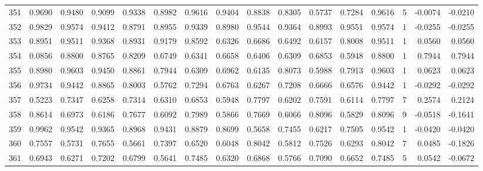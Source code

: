 \begin{tabular}{lrrrrrrrrrrrrrrr}
351 &      0.9690 &  0.9480 &  0.9099 &  0.9338 &  0.8982 &  0.9616 &  0.9404 &  0.8838 &  0.8305 &  0.5737 &   0.7284 &     0.9616 &      5 &                   -0.0074 &                    -0.0210 \\
352 &      0.9829 &  0.9574 &  0.9412 &  0.8791 &  0.8955 &  0.9339 &  0.8980 &  0.9544 &  0.9364 &  0.8993 &   0.9551 &     0.9574 &      1 &                   -0.0255 &                    -0.0255 \\
353 &      0.8951 &  0.9511 &  0.9368 &  0.8931 &  0.9179 &  0.8592 &  0.6326 &  0.6686 &  0.6492 &  0.6157 &   0.8008 &     0.9511 &      1 &                    0.0560 &                     0.0560 \\
354 &      0.0856 &  0.8800 &  0.8765 &  0.8209 &  0.6749 &  0.6341 &  0.6658 &  0.6406 &  0.6309 &  0.6853 &   0.5948 &     0.8800 &      1 &                    0.7944 &                     0.7944 \\
355 &      0.8980 &  0.9603 &  0.9450 &  0.8861 &  0.7944 &  0.6309 &  0.6962 &  0.6135 &  0.8073 &  0.5988 &   0.7913 &     0.9603 &      1 &                    0.0623 &                     0.0623 \\
356 &      0.9734 &  0.9442 &  0.8865 &  0.8003 &  0.5762 &  0.7294 &  0.6763 &  0.6267 &  0.7208 &  0.6666 &   0.6576 &     0.9442 &      1 &                   -0.0292 &                    -0.0292 \\
357 &      0.5223 &  0.7347 &  0.6258 &  0.7314 &  0.6310 &  0.6853 &  0.5948 &  0.7797 &  0.6202 &  0.7591 &   0.6114 &     0.7797 &      7 &                    0.2574 &                     0.2124 \\
358 &      0.8614 &  0.6973 &  0.6186 &  0.7677 &  0.6092 &  0.7989 &  0.5866 &  0.7669 &  0.6066 &  0.8096 &   0.5829 &     0.8096 &      9 &                   -0.0518 &                    -0.1641 \\
359 &      0.9962 &  0.9542 &  0.9365 &  0.8968 &  0.9431 &  0.8879 &  0.8699 &  0.5658 &  0.7455 &  0.6217 &   0.7505 &     0.9542 &      1 &                   -0.0420 &                    -0.0420 \\
360 &      0.7557 &  0.5731 &  0.7655 &  0.5661 &  0.7397 &  0.6520 &  0.6048 &  0.8042 &  0.5812 &  0.7526 &   0.6293 &     0.8042 &      7 &                    0.0485 &                    -0.1826 \\
361 &      0.6943 &  0.6271 &  0.7202 &  0.6799 &  0.5641 &  0.7485 &  0.6320 &  0.6868 &  0.5766 &  0.7090 &   0.6652 &     0.7485 &      5 &                    0.0542 &                    -0.0672 \\

\end{tabular}
